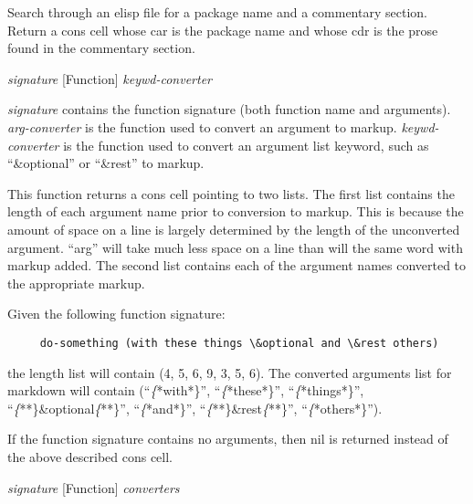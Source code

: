 \begin{doc-string}
Search through an elisp file for a package name and a commentary section.
Return a cons cell whose car is the package name and whose cdr is the prose
found in the commentary section.
\end{doc-string}

\vspace{1em}
\noindent
{}
\usebox{\funcname}\emph{signature}
 \hfill [Function]
\hspace*{\wd\funcname}\emph{keywd-converter}

\begin{doc-string}
\emph{signature} contains the function signature (both function name and arguments).
\emph{arg-converter} is the function used to convert an argument to markup.  \emph{keywd-converter}
is the function used to convert an argument list keyword, such as ``\&optional'' or ``\&rest''
to markup.

This function returns a cons cell pointing to two lists.  The first list contains the length
of each argument name prior to conversion to markup.  This is because the amount of space
on a line is largely determined by the length of the unconverted argument.  ``arg'' will
take much less space on a line than will the same word with markup added.  The second list
contains each of the argument names converted to the appropriate markup.

Given the following function signature:

\small{\begin{verbatim}
     do-something (with these things \&optional and \&rest others)
\end{verbatim}}

the length list will contain (4, 5, 6, 9, 3, 5, 6).  The converted arguments list for
markdown will contain (``\emph\{*with*\}'', ``\emph\{*these*\}'', ``\emph\{*things*\}'', ``\emph\{**\}\&optional\emph\{**\}'', ``\emph\{*and*\}'',
``\emph\{**\}\&rest\emph\{**\}'', ``\emph\{*others*\}'').

If the function signature contains no arguments, then nil is returned instead of the
above described cons cell.
\end{doc-string}

\vspace{1em}
\noindent
{}
\usebox{\funcname}\emph{signature}
 \hfill [Function]
\hspace*{\wd\funcname}\emph{converters}

